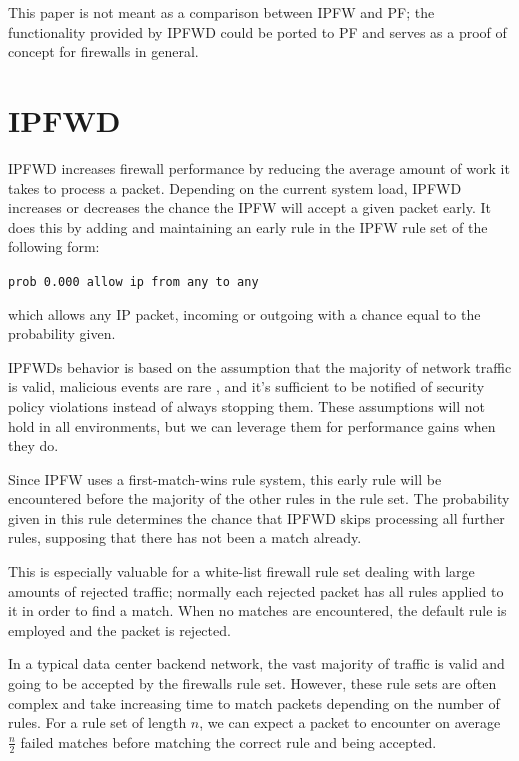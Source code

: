 \documentclass[journal]{IEEEtran}
\begin{document}
    This paper is not meant as a comparison between IPFW and PF; the
    functionality provided by IPFWD could be ported to PF and serves as a proof
    of concept for firewalls in general.


\section{IPFWD}

  IPFWD increases firewall performance by reducing the average amount of work
  it takes to process a packet. Depending on the current system load, IPFWD
  increases or decreases the chance the IPFW will accept a given packet early.
  It does this by adding and maintaining an early rule in the IPFW rule set of
  the following form: 
  \begin{center}
      \verb|prob 0.000 allow ip from any to any|
  \end{center}
  which allows any IP packet, incoming or outgoing with a chance equal to the probability given.

  IPFWDs behavior is based on the assumption that the majority of network
  traffic is valid, malicious events are rare \cite{networktrafficanalysis},
  and it's sufficient to be notified of security policy violations instead of
  always stopping them. These assumptions will not hold in all environments,
  but we can leverage them for performance gains when they do.

  Since IPFW uses a first-match-wins rule system, this early rule will be
  encountered before the majority of the other rules in the rule set.  The
  probability given in this rule determines the chance that IPFWD skips
  processing all further rules, supposing that there has not been a match
  already.  

  This is especially valuable for a white-list firewall rule set dealing with
  large amounts of rejected traffic; normally each rejected packet has all
  rules applied to it in order to find a match. When no matches are
  encountered, the default rule is employed and the packet is rejected. 

  In a typical data center backend network, the vast majority of traffic is
  valid and going to be accepted by the firewalls rule set. However, these
  rule sets are often complex and take increasing time to match packets
  depending on the number of rules. For a rule set of length $n$, we can expect
  a packet to encounter on average $\frac{n}{2}$ failed matches before matching
  the correct rule and being accepted.
\end{document}

